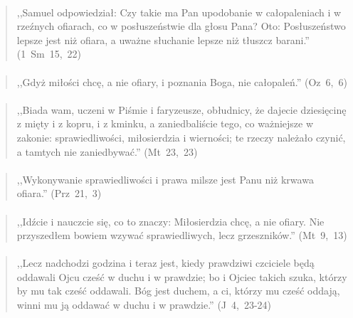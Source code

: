\documentclass[10pt,a4paper,oneside]{article}
\begin{document}
\paragraph{}
\begin{quote}
,,Samuel odpowiedział: Czy takie ma Pan upodobanie w całopaleniach i w rzeźnych ofiarach, co w posłuszeństwie dla głosu Pana? Oto: Posłuszeństwo lepsze jest niż ofiara, a uważne słuchanie lepsze niż tłuszcz barani.'' \mbox{(1 Sm 15, 22)}
\end{quote}
\paragraph{}
\begin{quote}
,,Gdyż miłości chcę, a nie ofiary, i poznania Boga, nie całopaleń.'' \mbox{(Oz 6, 6)}
\end{quote}
\paragraph{}
\begin{quote}
,,Biada wam, uczeni w Piśmie i faryzeusze, obłudnicy, że dajecie dziesięcinę z mięty i z kopru, i z kminku, a zaniedbaliście tego, co ważniejsze w zakonie: sprawiedliwości, miłosierdzia i wierności; te rzeczy należało czynić, a tamtych nie zaniedbywać.'' \mbox{(Mt 23, 23)}
\end{quote}
\paragraph{}
\begin{quote}
,,Wykonywanie sprawiedliwości i prawa milsze jest Panu niż krwawa ofiara.'' \mbox{(Prz 21, 3)}
\end{quote}
\paragraph{}
\begin{quote}
,,Idźcie i nauczcie się, co to znaczy: Miłosierdzia chcę, a nie ofiary. Nie przyszedłem bowiem wzywać sprawiedliwych, lecz grzeszników.'' \mbox{(Mt 9, 13)}
\end{quote}
\paragraph{}
\begin{quote}
,,Lecz nadchodzi godzina i teraz jest, kiedy prawdziwi czciciele będą oddawali Ojcu cześć w duchu i w prawdzie; bo i Ojciec takich szuka, którzy by mu tak cześć oddawali. Bóg jest duchem, a ci, którzy mu cześć oddają, winni mu ją oddawać w duchu i w prawdzie.'' \mbox{(J 4, 23-24)}
\end{quote}
\end{document}
